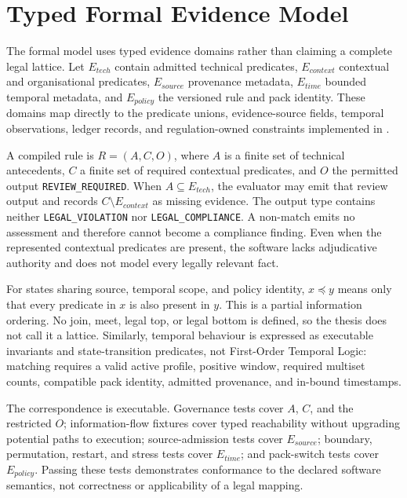\section{Typed Formal Evidence Model}

The formal model uses typed evidence domains rather than claiming a complete legal lattice. Let $E_{tech}$ contain admitted technical predicates, $E_{context}$ contextual and organisational predicates, $E_{source}$ provenance metadata, $E_{time}$ bounded temporal metadata, and $E_{policy}$ the versioned rule and pack identity. These domains map directly to the predicate unions, evidence-source fields, temporal observations, ledger records, and regulation-owned constraints implemented in .

A compiled rule is $R=(A,C,O)$, where $A$ is a finite set of technical antecedents, $C$ a finite set of required contextual predicates, and $O$ the permitted output \texttt{REVIEW\_REQUIRED}. When $A\subseteq E_{tech}$, the evaluator may emit that review output and records $C\setminus E_{context}$ as missing evidence. The output type contains neither \texttt{LEGAL\_VIOLATION} nor \texttt{LEGAL\_COMPLIANCE}. A non-match emits no assessment and therefore cannot become a compliance finding. Even when the represented contextual predicates are present, the software lacks adjudicative authority and does not model every legally relevant fact.

For states sharing source, temporal scope, and policy identity, $x\preceq y$ means only that every predicate in $x$ is also present in $y$. This is a partial information ordering. No join, meet, legal top, or legal bottom is defined, so the thesis does not call it a lattice. Similarly, temporal behaviour is expressed as executable invariants and state-transition predicates, not First-Order Temporal Logic: matching requires a valid active profile, positive window, required multiset counts, compatible pack identity, admitted provenance, and in-bound timestamps.

The correspondence is executable. Governance tests cover $A$, $C$, and the restricted $O$; information-flow fixtures cover typed reachability without upgrading potential paths to execution; source-admission tests cover $E_{source}$; boundary, permutation, restart, and stress tests cover $E_{time}$; and pack-switch tests cover $E_{policy}$. Passing these tests demonstrates conformance to the declared software semantics, not correctness or applicability of a legal mapping.
